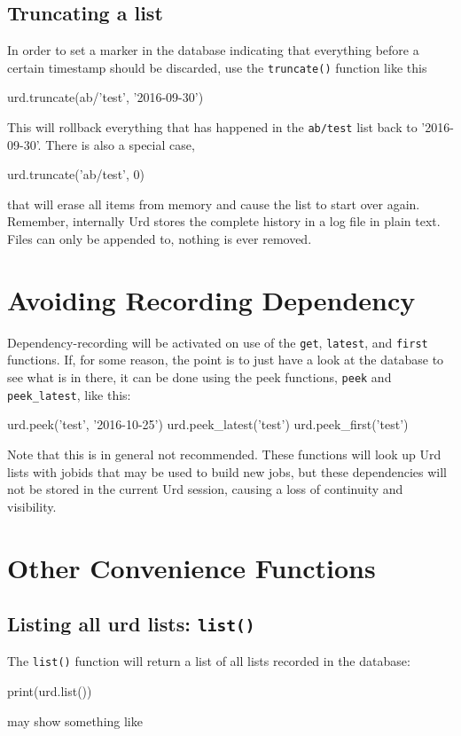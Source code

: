 \subsection{Truncating a list}
In order to set a marker in the database indicating that everything
before a certain timestamp should be discarded, use
the \texttt{truncate()} function like this
\begin{python}
urd.truncate(ab/'test', '2016-09-30')
\end{python}
This will rollback everything that has happened in
the \texttt{ab/test} list back to '2016-09-30'.  There is also a
special case,
\begin{python}
urd.truncate('ab/test', 0)
\end{python}
that will erase all items from memory and cause the list to start over
again.  Remember, internally Urd stores the complete history in a log
file in plain text.  Files can only be appended to, nothing is ever
removed.




\section{Avoiding Recording Dependency}
Dependency-recording will be activated on use of the \texttt{get},
\texttt{latest}, and \texttt{first} functions.  If, for some reason,
the point is to just have a look at the database to see what is in
there, it can be done using the peek functions, \texttt{peek} and
\texttt{peek\_latest}, like this:
\begin{python}
urd.peek('test', '2016-10-25')
urd.peek_latest('test')
urd.peek_first('test')
\end{python}
Note that this is in general not recommended.  These functions will
look up Urd lists with jobids that may be used to build new jobs, but
these dependencies will not be stored in the current Urd session,
causing a loss of continuity and visibility.



\section{Other Convenience Functions}
\subsection{Listing all urd lists:  \texttt{list()}}
The \texttt{list()} function will return a list of all lists recorded in
the database:
\begin{python}
print(urd.list())
\end{python}
may show something like
\begin{shell}
\end{shell}


